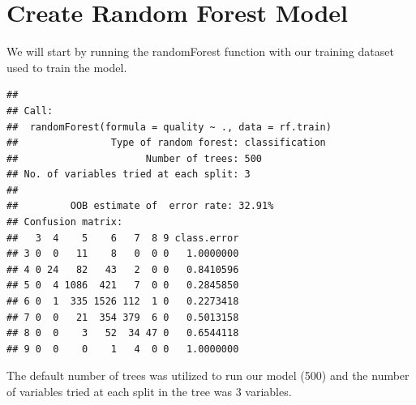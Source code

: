 \documentclass[
]{book}
\newenvironment{Shaded}{\begin{snugshade}}{\end{snugshade}}
\newcommand{\AttributeTok}[1]{\textcolor[rgb]{0.77,0.63,0.00}{#1}}
\newcommand{\CommentTok}[1]{\textcolor[rgb]{0.56,0.35,0.01}{\textit{#1}}}
\newcommand{\DecValTok}[1]{\textcolor[rgb]{0.00,0.00,0.81}{#1}}
\newcommand{\FunctionTok}[1]{\textcolor[rgb]{0.00,0.00,0.00}{#1}}
\newcommand{\NormalTok}[1]{#1}
\newcommand{\OtherTok}[1]{\textcolor[rgb]{0.56,0.35,0.01}{#1}}
\newcommand{\SpecialCharTok}[1]{\textcolor[rgb]{0.00,0.00,0.00}{#1}}
\begin{document}
\hypertarget{create-random-forest-model}{%
\section{Create Random Forest Model}\label{create-random-forest-model}}

We will start by running the randomForest function with our training dataset used to train the model.

\begin{Shaded}
\end{Shaded}

\begin{verbatim}
## 
## Call:
##  randomForest(formula = quality ~ ., data = rf.train) 
##                Type of random forest: classification
##                      Number of trees: 500
## No. of variables tried at each split: 3
## 
##         OOB estimate of  error rate: 32.91%
## Confusion matrix:
##   3  4    5    6   7  8 9 class.error
## 3 0  0   11    8   0  0 0   1.0000000
## 4 0 24   82   43   2  0 0   0.8410596
## 5 0  4 1086  421   7  0 0   0.2845850
## 6 0  1  335 1526 112  1 0   0.2273418
## 7 0  0   21  354 379  6 0   0.5013158
## 8 0  0    3   52  34 47 0   0.6544118
## 9 0  0    0    1   4  0 0   1.0000000
\end{verbatim}

The default number of trees was utilized to run our model (500) and the number of variables tried at each split in the tree was \(3\) variables.
\end{document}
